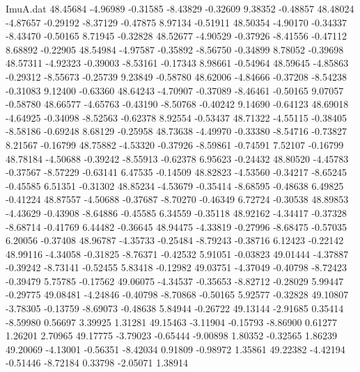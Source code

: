 \begin{filecontents}{ImuA.dat}
  48.45684   -4.96989   -0.31585   -8.43829   -0.32609    9.38352   -0.48857
  48.48024   -4.87657   -0.29192   -8.37129   -0.47875    8.97134   -0.51911
  48.50354   -4.90170   -0.34337   -8.43470   -0.50165    8.71945   -0.32828
  48.52677   -4.90529   -0.37926   -8.41556   -0.47112    8.68892   -0.22905
  48.54984   -4.97587   -0.35892   -8.56750   -0.34899    8.78052   -0.39698
  48.57311   -4.92323   -0.39003   -8.53161   -0.17343    8.98661   -0.54964
  48.59645   -4.85863   -0.29312   -8.55673   -0.25739    9.23849   -0.58780
  48.62006   -4.84666   -0.37208   -8.54238   -0.31083    9.12400   -0.63360
  48.64243   -4.70907   -0.37089   -8.46461   -0.50165    9.07057   -0.58780
  48.66577   -4.65763   -0.43190   -8.50768   -0.40242    9.14690   -0.64123
  48.69018   -4.64925   -0.34098   -8.52563   -0.62378    8.92554   -0.53437
  48.71322   -4.55115   -0.38405   -8.58186   -0.69248    8.68129   -0.25958
  48.73638   -4.49970   -0.33380   -8.54716   -0.73827    8.21567   -0.16799
  48.75882   -4.53320   -0.37926   -8.59861   -0.74591    7.52107   -0.16799
  48.78184   -4.50688   -0.39242   -8.55913   -0.62378    6.95623   -0.24432
  48.80520   -4.45783   -0.37567   -8.57229   -0.63141    6.47535   -0.14509
  48.82823   -4.53560   -0.34217   -8.65245   -0.45585    6.51351   -0.31302
  48.85234   -4.53679   -0.35414   -8.68595   -0.48638    6.49825   -0.41224
  48.87557   -4.50688   -0.37687   -8.70270   -0.46349    6.72724   -0.30538
  48.89853   -4.43629   -0.43908   -8.64886   -0.45585    6.34559   -0.35118
  48.92162   -4.34417   -0.37328   -8.68714   -0.41769    6.44482   -0.36645
  48.94475   -4.33819   -0.27996   -8.68475   -0.57035    6.20056   -0.37408
  48.96787   -4.35733   -0.25484   -8.79243   -0.38716    6.12423   -0.22142
  48.99116   -4.34058   -0.31825   -8.76371   -0.42532    5.91051   -0.03823
  49.01444   -4.37887   -0.39242   -8.73141   -0.52455    5.83418   -0.12982
  49.03751   -4.37049   -0.40798   -8.72423   -0.39479    5.75785   -0.17562
  49.06075   -4.34537   -0.35653   -8.82712   -0.28029    5.99447   -0.29775
  49.08481   -4.24846   -0.40798   -8.70868   -0.50165    5.92577   -0.32828
  49.10807   -3.78305   -0.13759   -8.69073   -0.48638    5.84944   -0.26722
  49.13144   -2.91685    0.35414   -8.59980    0.56697    3.39925    1.31281
  49.15463   -3.11904   -0.15793   -8.86900    0.61277    1.26201    2.70965
  49.17775   -3.79023   -0.65444   -9.00898    1.80352   -0.32565    1.86239
  49.20069   -4.13001   -0.56351   -8.42034    0.91809   -0.98972    1.35861
  49.22382   -4.42194   -0.51446   -8.72184    0.33798   -2.05071    1.38914

\end{filecontents}
